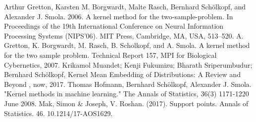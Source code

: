\documentclass[12pt]{article}
\begin{document}
\begin{thebibliography}{20}
 Arthur Gretton, Karsten M. Borgwardt, Malte Rasch, Bernhard Schölkopf, and Alexander J. Smola. 2006. A kernel method for the two-sample-problem. In Proceedings of the 19th International Conference on Neural Information Processing Systems (NIPS'06). MIT Press, Cambridge, MA, USA, 513–520.
 A. Gretton, K. Borgwardt, M. Rasch, B. Scholkopf, and A. Smola. A kernel method for the two sample
problem. Technical Report 157, MPI for Biological Cybernetics, 2007.
 Krikamol Muandet; Kenji Fukumizu; Bharath Sriperumbudur; Bernhard Schölkopf, Kernel Mean Embedding of Distributions: A Review and Beyond , now, 2017.
 Thomas Hofmann, Bernhard Schölkopf, Alexander J. Smola. "Kernel methods in machine learning." The Annals of Statistics, 36(3) 1171-1220 June 2008.
 Mak, Simon \& Joseph, V. Roshan. (2017). Support points. Annals of Statistics. 46. 10.1214/17-AOS1629. 
\end{thebibliography}
\end{document}

